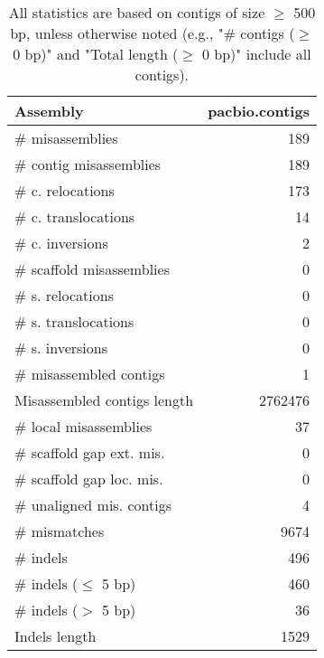 \documentclass[12pt,a4paper]{article}
\begin{document}
\begin{table}[ht]
\begin{center}
\caption{All statistics are based on contigs of size $\geq$ 500 bp, unless otherwise noted (e.g., "\# contigs ($\geq$ 0 bp)" and "Total length ($\geq$ 0 bp)" include all contigs).}
\begin{tabular}{|l*{1}{|r}|}
\hline
Assembly & pacbio.contigs \\ \hline
\# misassemblies & 189 \\ \hline
\hspace{2mm}\# contig misassemblies & 189 \\ \hline
\hspace{5mm}\# c. relocations & 173 \\ \hline
\hspace{5mm}\# c. translocations & 14 \\ \hline
\hspace{5mm}\# c. inversions & 2 \\ \hline
\hspace{2mm}\# scaffold misassemblies & 0 \\ \hline
\hspace{5mm}\# s. relocations & 0 \\ \hline
\hspace{5mm}\# s. translocations & 0 \\ \hline
\hspace{5mm}\# s. inversions & 0 \\ \hline
\# misassembled contigs & 1 \\ \hline
Misassembled contigs length & 2762476 \\ \hline
\# local misassemblies & 37 \\ \hline
\# scaffold gap ext. mis. & 0 \\ \hline
\# scaffold gap loc. mis. & 0 \\ \hline
\# unaligned mis. contigs & 4 \\ \hline
\# mismatches & 9674 \\ \hline
\# indels & 496 \\ \hline
\hspace{5mm}\# indels ($\leq$ 5 bp) & 460 \\ \hline
\hspace{5mm}\# indels ($>$ 5 bp) & 36 \\ \hline
Indels length & 1529 \\ \hline
\end{tabular}
\end{center}
\end{table}
\end{document}
